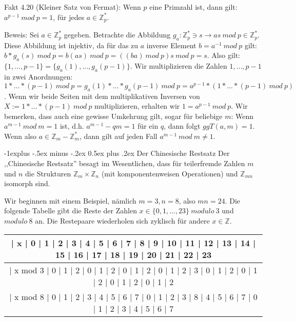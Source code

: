 \documentclass[a4paper]{article}
\makeatletter
\renewcommand{\subsection}{\@startsection{subsection}{2}{0mm}%
 {-1explus -.5ex minus -.2ex}%
 {0.5ex plus .2ex}%
 {\normalfont\normalsize\bfseries}}
\makeatother
\begin{document}
\begin{multicols}{3}
    Fakt 4.20 (Kleiner Satz von Fermat): Wenn $p$ eine Primzahl ist, dann gilt: $a^{p-1}\ mod\ p= 1$, für jedes $a\in\mathbb{Z}^*_p$.

    Beweis: Sei $a\in\mathbb{Z}^*_p$ gegeben. Betrachte die Abbildung $g_a: \mathbb{Z}^*_p \owns s\rightarrow as\ mod\ p\in\mathbb{Z}^*_p$. Diese Abbildung ist injektiv, da für das zu $a$ inverse Element $b=a^{-1}\ mod\ p$ gilt: $b*g_a(s)\ mod\ p=b(as)\ mod\ p=((ba)\ mod\ p)s\ mod\ p=s$. Also gilt: $\{1,...,p-1\}=\{g_a(1),...,g_a(p-1)\}$.
    Wir multiplizieren die Zahlen $1,...,p-1$ in zwei Anordnungen: $1*...*(p-1)\ mod\ p =g_a(1) *...*g_a(p-1)\ mod\ p=a^{p-1} *(1*...*(p-1)\ mod\ p)$.
    Wenn wir beide Seiten mit dem multiplikativen Inversen von $X:= 1*...*(p-1)\ mod\ p$ multiplizieren, erhalten wir $1=a^{p-1}\ mod\ p$.
    Wir bemerken, dass auch eine gewisse Umkehrung gilt, sogar für beliebige $m$: Wenn $a^{m-1}\ mod\ m=1$ ist, d.h. $a^{m-1}-qm=1$ für ein $q$, dann folgt $ggT(a,m)=1$. Wenn also $a\in\mathbb{Z}_m -\mathbb{Z}^*_m$, dann gilt auf jeden Fall $a^{m-1}\ mod\ m\not= 1$.

    \subsection{Der Chinesische Restsatz}
    Der ,,Chinesische Restsatz'' besagt im Wesentlichen, dass für teilerfremde Zahlen $m$ und $n$ die Strukturen $\mathbb{Z}_m \times\mathbb{Z}_n$ (mit komponentenweisen Operationen) und $\mathbb{Z}_{mn}$ isomorph sind.

    Wir beginnen mit einem Beispiel, nämlich $m=3,n=8$, also $mn=24$. Die folgende Tabelle gibt die Reste der Zahlen $x\in\{0,1,...,23\}\ modulo\ 3$ und $modulo\ 8$ an. Die Restepaare wiederholen sich zyklisch für andere $x\in\mathbb{Z}$.

    \begin{tabular}{c}
    | x  | 0  | 1  | 2  | 3  | 4  | 5  | 6  | 7  | 8  | 9  | 10 | 11 | 12 | 13 | 14 | 15 | 16 | 17 | 18 | 19 | 20 | 21 | 22 | 23 \\\hline
    | x mod 3 | 0  | 1  | 2  | 0  | 1  | 2  | 0  | 1  | 2  | 0  | 1  | 2  | 3  | 0  | 1  | 2  | 0  | 1  | 2  | 0  | 1  | 2  | 0  | 1  | 2  \\
    | x mod 8 | 0  | 1  | 2  | 3  | 4  | 5  | 6  | 7  | 0  | 1  | 2  | 3  | 8  | 4  | 5  | 6  | 7  | 0  | 1  | 2  | 3  | 4  | 5  | 6  | 7  
    \end{tabular}


\end{multicols}
\end{document}
